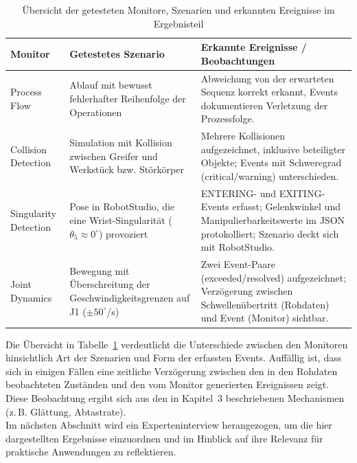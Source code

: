 \begin{table}[H]
	\centering
	\small
	\begin{tabularx}{\textwidth}{lXX}
		\toprule
		\textbf{Monitor}      & \textbf{Getestetes Szenario}                                                               & \textbf{Erkannte Ereignisse / Beobachtungen}                                                                                               \\
		\midrule
		Process Flow          & Ablauf mit bewusst fehlerhafter Reihenfolge der Operationen                                & Abweichung von der erwarteten Sequenz korrekt erkannt, Events dokumentieren Verletzung der Prozessfolge.                                   \\
		\addlinespace
		Collision Detection   & Simulation mit Kollision zwischen Greifer und Werkstück bzw. Störkörper                    & Mehrere Kollisionen aufgezeichnet, inklusive beteiligter Objekte; Events mit Schweregrad (critical/warning) unterschieden.                 \\
		\addlinespace
		Singularity Detection & Pose in RobotStudio, die eine Wrist-Singularität ($\theta_{5} \approx 0^\circ$) provoziert & ENTERING- und EXITING-Events erfasst; Gelenkwinkel und Manipulierbarkeitswerte im JSON protokolliert; Szenario deckt sich mit RobotStudio. \\
		\addlinespace
		Joint Dynamics        & Bewegung mit Überschreitung der Geschwindigkeitsgrenzen auf J1 ($\pm 50^\circ$/s)          & Zwei Event-Paare (exceeded/resolved) aufgezeichnet; Verzögerung zwischen Schwellenübertritt (Rohdaten) und Event (Monitor) sichtbar.       \\
		\bottomrule
	\end{tabularx}
	\caption{Übersicht der getesteten Monitore, Szenarien und erkannten Ereignisse im Ergebnisteil}
	\label{tab:monitor_overview}
\end{table}

\noindent
Die Übersicht in Tabelle~\ref{tab:monitor_overview} verdeutlicht die Unterschiede
zwischen den Monitoren hinsichtlich Art der Szenarien und Form der erfassten Events.
Auffällig ist, dass sich in einigen Fällen eine zeitliche Verzögerung zwischen
den in den Rohdaten beobachteten Zuständen und den vom Monitor generierten
Ereignissen zeigt. Diese Beobachtung ergibt sich aus den in Kapitel~3 beschriebenen
Mechanismen (z.\,B. Glättung, Abtastrate).\\

\noindent
Im nächsten Abschnitt wird ein Experteninterview herangezogen, um die hier
dargestellten Ergebnisse einzuordnen und im Hinblick auf ihre Relevanz für
praktische Anwendungen zu reflektieren.
